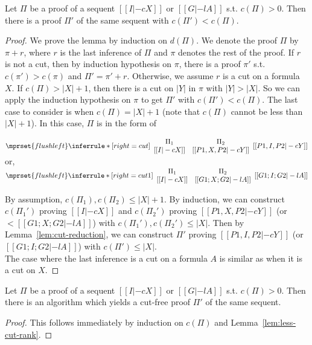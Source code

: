 \begin{lemma}
  \label{lem:less-cut-rank}
  Let $\Pi$ be a proof of a sequent $[[I |-c X]]$ or $[[G |-l A]]$ s.t.
  $c(\Pi)>0$. Then there is a proof $\Pi'$ of the same sequent with
  $c(\Pi')<c(\Pi)$.
\end{lemma}
\begin{proof}
  We prove the lemma by induction on $d(\Pi)$. We denote the proof $\Pi$ by 
  $\pi+r$, where $r$ is the last inference of $\Pi$ and $\pi$ denotes the
  rest of the proof. If $r$ is not a cut, then by induction hypothesis on
  $\pi$, there is a proof $\pi'$ s.t. $c(\pi')>c(\pi)$ and $\Pi'=\pi'+r$.
  Otherwise, we assume $r$ is a cut on a formula $X$. If $c(\Pi)>|X|+1$,
  then there is a cut on $|Y|$ in $\pi$ with $|Y|>|X|$. So we can apply
  the induction hypothesis on $\pi$ to get $\Pi'$ with $c(\Pi')<c(\Pi)$. The
  last case to consider is when $c(\Pi)=|X|+1$ (note that $c(\Pi)$ cannot be
  less than $|X|+1$). In this case, $\Pi$ is in the form of
  \begin{center}
    \scriptsize
    \begin{math}
      $$\mprset{flushleft}
      \inferrule* [right={\tiny cut}] {
        {
          \begin{array}{cc}
            \Pi_1 & \Pi_2 \\
            {[[I |-c X]]} & {[[P1, X, P2 |-c Y]]}
          \end{array}
        }
      }{[[P1, I, P2 |-c Y]]}
    \end{math}
    \qquad\qquad
    or,
    \begin{math}
      $$\mprset{flushleft}
      \inferrule* [right={\tiny cut1}] {
        {
          \begin{array}{cc}
            \Pi_1 & \Pi_2 \\
            {[[I |-c X]]} & {[[G1; X; G2 |-l A]]}
          \end{array}
        }
      }{[[G1; I; G2 |-l A]]}
    \end{math}
  \end{center}
  By assumption, $c(\Pi_1),c(\Pi_2)\leq |X|+1$. By induction, we can
  construct $c(\Pi_1')$ proving $[[I |-c X]]$ and $c(\Pi_2')$ proving
  $[[P1, X, P2 |-c Y]]$ (or $<[[G1; X; G2 |-l A]]$) with
  $c(\Pi_1'), c(\Pi_2')\leq |X|$. Then by Lemma~\ref{lem:cut-reduction}, we 
  can construct $\Pi'$ proving $[[P1, I, P2 |-c Y]]$ (or
  $[[G1; I; G2 |-l A]]$) with $c(\Pi')\leq |X|$. \\
  The case where the last inference is a cut on a formula $A$ is similar as 
  when it is a cut on $X$.
\end{proof}

\begin{theorem}
  Let $\Pi$ be a proof of a sequent $[[I |-c X]]$ or $[[G |-l A]]$ s.t.
  $c(\Pi)>0$. Then there is an algorithm which yields a cut-free proof
  $\Pi'$ of the same sequent.
\end{theorem}
\begin{proof}
  This follows immediately by induction on $c(\Pi)$ and
  Lemma~\ref{lem:less-cut-rank}.
\end{proof}
